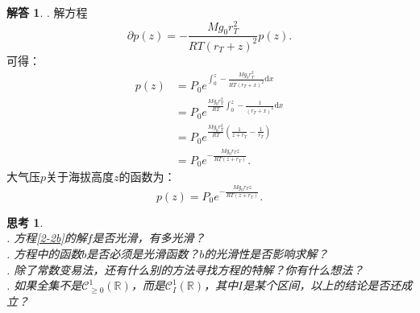 \documentclass[12pt,UTF8]{ctexbook}
\theoremstyle{definition}
\newtheorem*{so}{解答}
\theoremstyle{plain}
\newtheorem{sk}{思考}[section]
\begin{document}
\begin{so}
    . 解方程
    $$ \partial p(z) = -\frac{Mg_0r_T^2}{RT(r_T + z)^2} p(z). $$
    可得：
    \begin{align*}
        p(z) &= P_0e^{\int_0^z -\frac{Mg_0r_T^2}{RT(r_T + x)^2}\mathrm{d}x} \\
        &= P_0e^{\frac{Mg_0r_T^2}{RT}\int_0^z -\frac{1}{(r_T + x)^2}\mathrm{d}x} \\
        &= P_0e^{\frac{Mg_0r_T^2}{RT}\left(\frac{1}{z + r_T} - \frac{1}{r_T}\right)} \\
        &= P_0e^{-\frac{Mg_0r_Tz}{RT(z + r_T)}}.
    \end{align*}
    大气压$p$关于海拔高度$z$的函数为：
    $$ p(z) = P_0 e^{-\frac{Mg_0r_Tz}{RT(z + r_T)}} . $$

\end{so}

\begin{sk}
    \mbox{} \\
    . 方程\eqref{2-2b}的解$f$是否光滑，有多光滑？\\
    . 方程\label{2-2c}中的函数$b$是否必须是光滑函数？$b$的光滑性是否影响求解？\\
    . 除了常数变易法，还有什么别的方法寻找方程\label{2-2c}的特解？你有什么想法？\\
    . 如果全集不是$\mathcal{C}^1_{\geqslant 0}(\mathbb{R})$，而是$\mathcal{C}^1_I(\mathbb{R})$，其中$I$是某个区间，以上的结论是否还成立？
    
\end{sk}
\end{document}
